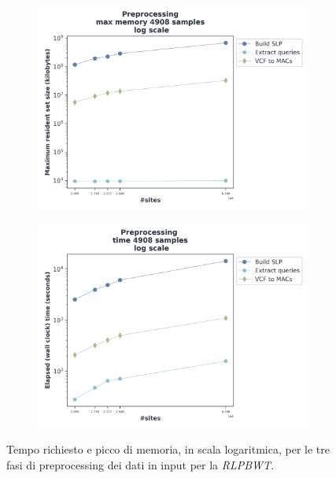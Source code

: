 \begin{figure}
  \centering
  \begin{subfigure}{.5\textwidth}
    \centering
    \includegraphics[width=\linewidth]{img/pre_mem_log.png}
  \end{subfigure}%
  \begin{subfigure}{.5\textwidth}
    \centering
    \includegraphics[width=\linewidth]{img/pre_time_log.png}
  \end{subfigure}
  \caption{Tempo richiesto e picco di memoria, in scala logaritmica, per le
    tre fasi di preprocessing 
    dei dati in input per la \textit{RLPBWT}.}
  \label{fig:prechr}
\end{figure}

